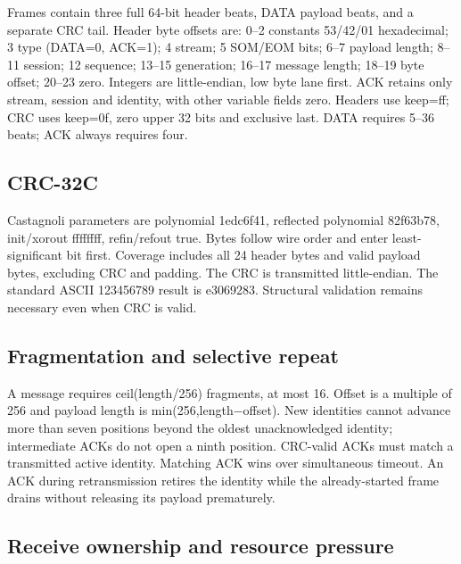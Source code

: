 \documentclass[11pt,a4paper]{article}
\begin{document}
Frames contain three full 64-bit header beats,\allowbreak{} DATA payload beats,\allowbreak{} and a separate CRC tail. Header byte offsets are: 0–2 constants 53/\allowbreak{}42/\allowbreak{}01 hexadecimal; 3 type (\allowbreak{}DATA=\allowbreak{}0,\allowbreak{} ACK=\allowbreak{}1)\allowbreak{}; 4 stream; 5 SOM/\allowbreak{}EOM bits; 6–7 payload length; 8–11 session; 12 sequence; 13–15 generation; 16–17 message length; 18–19 byte offset; 20–23 zero. Integers are little-endian,\allowbreak{} low byte lane first. ACK retains only stream,\allowbreak{} session and identity,\allowbreak{} with other variable fields zero. Headers use keep=\allowbreak{}ff; CRC uses keep=\allowbreak{}0f,\allowbreak{} zero upper 32 bits and exclusive last. DATA requires 5–36 beats; ACK always requires four.

\subsection{CRC-32C}

Castagnoli parameters are polynomial 1edc6f41,\allowbreak{} reflected polynomial 82f63b78,\allowbreak{} init/\allowbreak{}xorout ffffffff,\allowbreak{} refin/\allowbreak{}refout true. Bytes follow wire order and enter least-significant bit first. Coverage includes all 24 header bytes and valid payload bytes,\allowbreak{} excluding CRC and padding. The CRC is transmitted little-endian. The standard ASCII 123456789 result is e3069283. Structural validation remains necessary even when CRC is valid.

\subsection{Fragmentation and selective repeat}

A message requires ceil(\allowbreak{}length/\allowbreak{}256)\allowbreak{} fragments,\allowbreak{} at most 16. Offset is a multiple of 256 and payload length is min(\allowbreak{}256,\allowbreak{}length−offset)\allowbreak{}. New identities cannot advance more than seven positions beyond the oldest unacknowledged identity; intermediate ACKs do not open a ninth position. CRC-valid ACKs must match a transmitted active identity. Matching ACK wins over simultaneous timeout. An ACK during retransmission retires the identity while the already-started frame drains without releasing its payload prematurely.

\subsection{Receive ownership and resource pressure}
\end{document}
